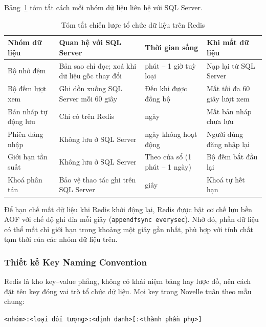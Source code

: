 Bảng~\ref{tab:redis-strategy} tóm tắt cách mỗi nhóm dữ liệu liên hệ với SQL Server.

\begin{table}[H]
\centering
\small
\renewcommand{\arraystretch}{1.3}
\begin{tabularx}{\textwidth}{|>{\raggedright\arraybackslash}p{3.2cm}|>{\raggedright\arraybackslash}X|>{\raggedright\arraybackslash}p{3.2cm}|>{\raggedright\arraybackslash}p{2.6cm}|}
\hline
\textbf{Nhóm dữ liệu} & \textbf{Quan hệ với SQL Server} & \textbf{Thời gian sống} & \textbf{Khi mất dữ liệu} \\ \hline
Bộ nhớ đệm & Bản sao chỉ đọc; xoá khi dữ liệu gốc thay đổi & 2 phút -- 1 giờ tuỳ loại & Nạp lại từ SQL Server \\ \hline
Bộ đếm lượt xem & Ghi dồn xuống SQL Server mỗi 60 giây & Đến khi được đồng bộ & Mất tối đa 60 giây lượt xem \\ \hline
Bản nháp tự động lưu & Chỉ có trên Redis & 7 ngày & Mất bản nháp chưa lưu \\ \hline
Phiên đăng nhập & Không lưu ở SQL Server & 7 ngày không hoạt động & Người dùng đăng nhập lại \\ \hline
Giới hạn tần suất & Không lưu ở SQL Server & Theo cửa sổ (1 phút -- 1 ngày) & Bộ đếm bắt đầu lại \\ \hline
Khoá phân tán & Bảo vệ thao tác ghi trên SQL Server & 5 giây & Khoá tự hết hạn \\ \hline
\end{tabularx}
\caption{Tóm tắt chiến lược tổ chức dữ liệu trên Redis}
\label{tab:redis-strategy}
\end{table}

Để hạn chế mất dữ liệu khi Redis khởi động lại, Redis được bật cơ chế lưu bền AOF với chế độ ghi đĩa mỗi giây (\texttt{appendfsync everysec}). Nhờ đó, phần dữ liệu có thể mất chỉ giới hạn trong khoảng một giây gần nhất, phù hợp với tính chất tạm thời của các nhóm dữ liệu trên.

\subsubsection{Thiết kế Key Naming Convention}
\label{subsubsec:redis-keys}

Redis là kho key--value phẳng, không có khái niệm bảng hay lược đồ, nên cách đặt tên key đóng vai trò tổ chức dữ liệu. Mọi key trong Novelle tuân theo mẫu chung:

\begin{center}
\texttt{<nhóm>:<loại đối tượng>:<định danh>[:<thành phần phụ>]}
\end{center}

